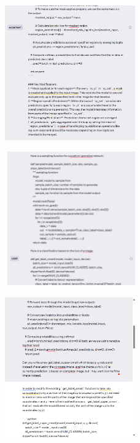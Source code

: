 \documentclass{article}
\begin{document}
\begin{figure}[H]
    \centering
    \includegraphics[width=0.5\textwidth]{report_data/g-14.png}
\end{figure}

\begin{figure}[H]
    \centering
    \includegraphics[width=0.5\textwidth]{report_data/g-14_.png}
\end{figure}

\begin{figure}[H]
    \centering
    \includegraphics[width=0.5\textwidth]{report_data/g-15.png}
\end{figure}
\end{document}
